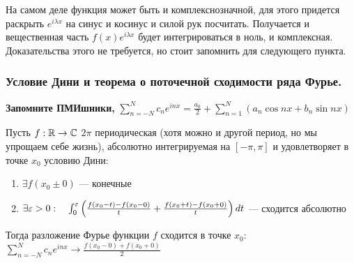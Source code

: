На самом деле функция может быть и комплекснозначной, для этого придется раскрыть $e^{i\lambda x}$
на синус и косинус и силой рук посчитать. Получается и вещественная часть $f(x) e^{i\lambda x}$
будет интегрироваться в ноль, и комплексная.
Доказательства этого не требуется, но стоит запомнить для следующего пункта.

\subsubsection{Условие Дини и теорема о поточечной сходимости ряда Фурье.}
\textbf{Запомните ПМИшники, }
$\sum_{n = -N}^N c_n e^{inx} = \frac{a_0}{2} + \sum_{n=1}^{N} \left( a_n \cos nx + b_n \sin nx \right)$

\begin{theorem*}
Пусть $f: \mathbb{R} \to \mathbb{C}$ $2 \pi$ периодическая (хотя можно и другой период, но мы упрощаем себе жизнь),
абсолютно интегрируемая на $[-\pi, \pi]$ и удовлетворяет в точке $x_0$ условию Дини:
\begin{enumerate}
\item $\exists f(x_0 \pm 0) $ — конечные
\item $\exists \varepsilon > 0: \quad
    \int_0^{\varepsilon} \left( \frac{f(x_0 - t) - f(x_0 - 0)}{t} + \frac{f(x_0 + t) - f(x_0 + 0)}{t} \right) dt$
    — сходится абсолютно
\end{enumerate}

Тогда разложение Фурье функции $f$ сходится в точке $x_0$:
$\sum_{n=-N}^{N} c_n e^{inx} \to \frac{f(x_0 - 0) + f(x_0 + 0)}{2} $

\end{theorem*}

